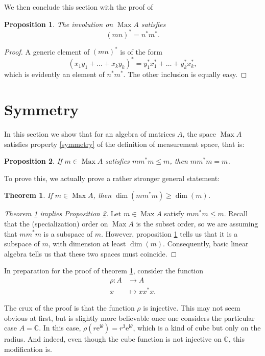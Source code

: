 \documentclass{article}
\theoremstyle{plain}
\newtheorem{theorem}{Theorem}
\newtheorem{prop}{Proposition}
\theoremstyle{nonumberplain}
\newtheorem{proof}{Proof}
\DeclareMathOperator{\Max}{Max}
\newcommand{\C}{\mathbb{C}}
\newcommand{\e}{\mathrm{e}}
\newcommand{\I}{\mathrm{i}}
\begin{document}
We then conclude this section with the proof of
\begin{prop}
The involution on $\Max A$ satisfies
\[ (mn)^* = n^* m^*.\]
\end{prop}

\begin{proof}
A generic element of $(mn)^*$ is of the form
\[(x_1 y_1 + \dots + x_k y_k)^* = y_1^* x_1^* + \dots + y_k^* x_k^*,\]
which is evidently an element of $n^* m^*$. The other inclusion is equally easy.
\end{proof}

\section{Symmetry}

In this section we show that for an algebra of matrices $A$, the space $\Max A$ satisfies property \ref{symmetry} of the definition of measurement space, that is:
\begin{prop}\label{propsymmetry}
If $m \in \Max A$ satisfies $m m^* m \leq m$, then $m m^* m = m$.
\end{prop}

To prove this, we actually prove a rather stronger general statement:

\begin{theorem}\label{propstrongsymmetry}
If $m \in \Max A$, then $\dim(m m^* m) \geq \dim(m)$.
\end{theorem}

\begin{proof}[Theorem \ref{propstrongsymmetry} implies Proposition \ref{propsymmetry}]
Let $m \in \Max A$ satisfy $m m^* m \leq m$. Recall that the (specialization) order on $\Max A$ is the subset order, so we are assuming that $m m^* m$ is a subspace of $m$. However, proposition \ref{propstrongsymmetry} tells us that it is a subspace of $m$, with dimension at least $\dim(m)$. Consequently, basic linear algebra tells us that these two spaces must coincide.
\end{proof}

In preparation for the proof of theorem \ref{propstrongsymmetry}, consider the function
\begin{align*}
\rho \colon A &\to A\\
x &\mapsto x x^* x.
\end{align*}

The crux of the proof is that the function $\rho$ is injective. This may not seem obvious at first, but is slightly more believable once one considers the particular case $A = \C$. In this case, $\rho(r \e^{\I \theta}) = r^3 \e^{\I \theta}$, which is a kind of cube but only on the radius. And indeed, even though the cube function is not injective on $\C$, this modification is.
\end{document}

